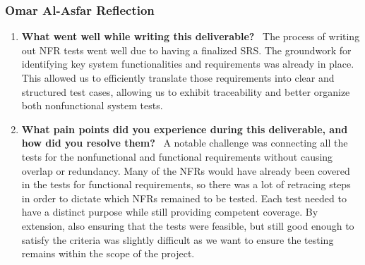 \documentclass[12pt, titlepage]{article}
\begin{document}
\subsubsection*{Omar Al-Asfar Reflection}
\begin{enumerate}
\item \textbf{What went well while writing this deliverable?} \
The process of writing out NFR tests went well due to having a finalized SRS. The groundwork for identifying key system functionalities and requirements was already in place. This allowed us to efficiently translate those requirements into clear and structured test cases, allowing us to exhibit traceability and better organize both nonfunctional system tests.

\item \textbf{What pain points did you experience during this deliverable, and how did you resolve them?} \
A notable challenge was connecting all the tests for the nonfunctional and functional requirements without causing overlap or redundancy. Many of the NFRs would have already been covered in the tests for functional requirements, so there was a lot of retracing steps in order to dictate which NFRs remained to be tested. Each test needed to have a distinct purpose while still providing competent coverage. By extension, also ensuring that the tests were feasible, but still good enough to satisfy the criteria was slightly difficult as we want to ensure the testing remains within the scope of the project.
\end{enumerate}
\end{document}
